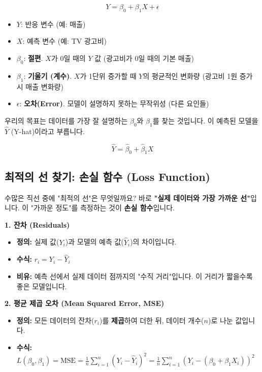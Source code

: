 \documentclass[11pt,a4paper]{book}
\theoremstyle{definition}
\begin{document}
$$ Y = \beta_0 + \beta_1 X + \epsilon $$

\begin{itemize}
    \item $Y$: 반응 변수 (예: 매출)
    \item $X$: 예측 변수 (예: TV 광고비)
    \item $\beta_0$: \textbf{절편}. $X$가 0일 때의 $Y$ 값 (광고비가 0일 때의 기본 매출)
    \item $\beta_1$: \textbf{기울기 (계수)}. $X$가 1단위 증가할 때 $Y$의 평균적인 변화량 (광고비 1원 증가 시 매출 변화량)
    \item $\epsilon$: \textbf{오차(Error)}. 모델이 설명하지 못하는 무작위성 (다른 요인들)
\end{itemize}

우리의 목표는 데이터를 가장 잘 설명하는 $\beta_0$와 $\beta_1$를 찾는 것입니다. 이 예측된 모델을 $\hat{Y}$ (Y-hat)이라고 부릅니다.

$$ \hat{Y} = \hat{\beta}_0 + \hat{\beta}_1 X $$

\subsection{최적의 선 찾기: 손실 함수 (Loss Function)}

수많은 직선 중에 "최적의 선"은 무엇일까요?
바로 \textbf{"실제 데이터와 가장 가까운 선"}입니다.
이 "가까운 정도"를 측정하는 것이 \textbf{손실 함수}입니다.

\textbf{1. 잔차 (Residuals)}

\begin{itemize}
    \item \textbf{정의:} 실제 값($Y_i$)과 모델의 예측 값($\hat{Y}_i$)의 차이입니다.
    \item \textbf{수식:} $r_i = Y_i - \hat{Y}_i$
    \item \textbf{비유:} 예측 선에서 실제 데이터 점까지의 "수직 거리"입니다. 이 거리가 짧을수록 좋은 모델입니다.
\end{itemize}

\textbf{2. 평균 제곱 오차 (Mean Squared Error, MSE)}

\begin{itemize}
    \item \textbf{정의:} 모든 데이터의 잔차($r_i$)를 \textbf{제곱}하여 더한 뒤, 데이터 개수($n$)로 나눈 값입니다.
    \item \textbf{수식:} $L(\beta_0, \beta_1) = \text{MSE} = \frac{1}{n} \sum_{i=1}^{n} (Y_i - \hat{Y}_i)^2 = \frac{1}{n} \sum_{i=1}^{n} (Y_i - (\beta_0 + \beta_1 X_i))^2$
\end{itemize}
\end{document}
